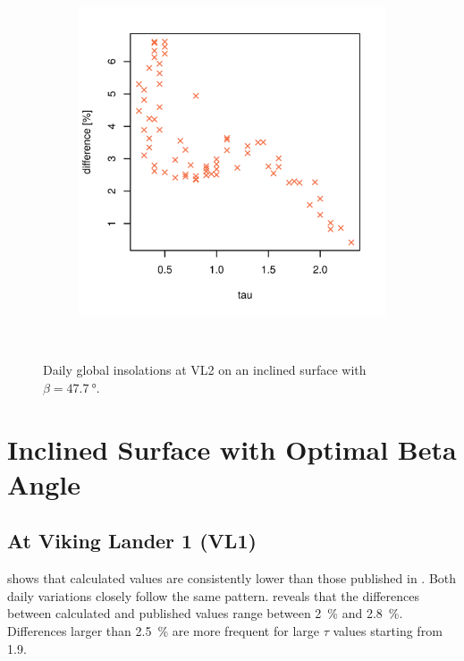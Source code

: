 \begin{figure}[h]
\begin{subfigure}[t]{\subfigureWidth}
            \includegraphics[height=\graphicsHeight]{sections/appendix/insolation-calculation-verification/plots/h-diff-bet-exp-calc-at-vl2-with-beta-477-deg.png}
            \label{fig:sub:comparative-global-insolation-at-vl2-beta-equals-phi-percentage-differences}
    \end{subfigure}\\[0.8ex]
    \caption[Daily global insolations at Viking Lander 2 on an inclined surface with $\beta=\SI{47.7}{\degree}$]
    {Daily global insolations at \ac{VL2} on an inclined surface with $\beta=\SI{47.7}{\degree}$.}
    \label{fig:plot:comparative-global-insolation-at-vl2-beta-equals-phi}
\vspace{-2ex}
\end{figure}

\section{Inclined Surface with Optimal Beta Angle}
\subsection{At Viking Lander 1 (VL1)}
 shows that calculated values are consistently lower than those published in . Both daily variations closely follow the same pattern.  reveals that the differences between calculated and published values range between \SI{2}{\percent} and \SI{2.8}{\percent}. Differences larger than \SI{2.5}{\percent} are more frequent for large $\tau$ values starting from 1.9.

